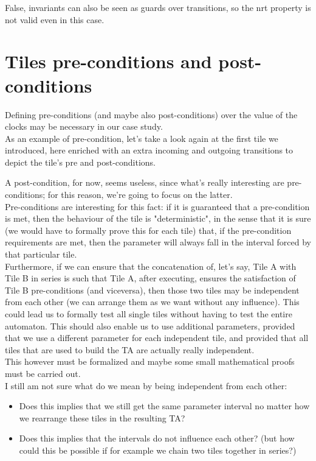 \documentclass[12pt, a4paper]{article}
\begin{document}
\noindent
False, invariants can also be seen as guards over transitions, so the nrt property is not valid even in this case.

\newpage

\section{Tiles pre-conditions and post-conditions}

\noindent
Defining pre-conditions (and maybe also post-conditions) over the value of the clocks may be necessary in our case study.\\
As an example of pre-condition, let's take a look again at the first tile we introduced, here enriched with an extra incoming and outgoing transitions to depict the tile's pre and post-conditions.



\noindent
A post-condition, for now, seems useless, since what's really interesting are pre-conditions; for this reason, we're going to focus on the latter.\\
Pre-conditions are interesting for this fact: if it is guaranteed that a pre-condition is met, then the behaviour of the tile is "deterministic", in the sense that it is sure (we would have to formally prove this for each tile) that, if the pre-condition requirements are met, then the parameter will always fall in the interval forced by that particular tile.\\

\noindent
Furthermore, if we can ensure that the concatenation of, let's say, Tile A with Tile B in series is such that Tile A, after executing, ensures the satisfaction of Tile B pre-conditions (and viceversa), then those two tiles may be independent from each other (we can arrange them as we want without any influence). This could lead us to formally test all single tiles without having to test the entire automaton. This should also enable us to use additional parameters, provided that we use a different parameter for each independent tile, and provided that all tiles that are used to build the TA are actually really independent.\\
This however must be formalized and maybe some small mathematical proofs must be carried out.\\

\noindent
I still am not sure what do we mean by being independent from each other: 
\begin{itemize}
\item Does this implies that we still get the same parameter interval no matter how we rearrange these tiles in the resulting TA?
\item Does this implies that the intervals do not influence each other? (but how could this be possible if for example we chain two tiles together in series?)
\end{itemize}
\end{document}
